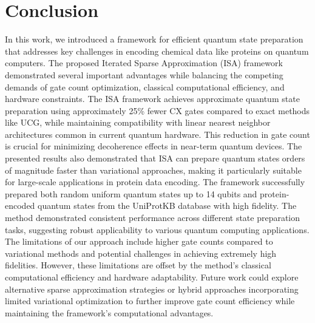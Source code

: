 \section{Conclusion}

In this work, we introduced a framework for efficient quantum state preparation that addresses key challenges in encoding chemical data like proteins on quantum computers. The proposed Iterated Sparse Approximation (ISA) framework demonstrated several important advantages while balancing the competing demands of gate count optimization, classical computational efficiency, and hardware constraints. The ISA framework achieves approximate quantum state preparation using approximately 25\% fewer CX gates compared to exact methods like UCG, while maintaining compatibility with linear nearest neighbor architectures common in current quantum hardware. This reduction in gate count is crucial for minimizing decoherence effects in near-term quantum devices. The presented results also demonstrated that ISA can prepare quantum states orders of magnitude faster than variational approaches, making it particularly suitable for large-scale applications in protein data encoding. The framework successfully prepared both random uniform quantum states up to 14 qubits and protein-encoded quantum states from the UniProtKB database with high fidelity. The method demonstrated consistent performance across different state preparation tasks, suggesting robust applicability to various quantum computing applications. The limitations of our approach include higher gate counts compared to variational methods and potential challenges in achieving extremely high fidelities. However, these limitations are offset by the method's classical computational efficiency and hardware adaptability. Future work could explore alternative sparse approximation strategies or hybrid approaches incorporating limited variational optimization to further improve gate count efficiency while maintaining the framework's computational advantages.